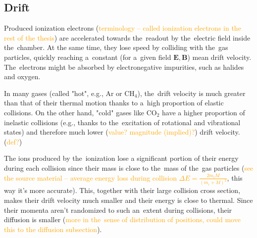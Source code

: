 		\subsection{Drift}
			Produced ionization electrons (\textcolor{orange}{terminology -- called ionization electrons in the rest of the thesis}) are accelerated towards the~readout by the~electric field inside the~chamber. At the same time, they lose speed by colliding with the~gas particles, quickly reaching a~constant (for a~given field $\mathbf{E}, \mathbf{B}$) mean drift velocity. The~electrons might be absorbed by electronegative impurities, such as halides and oxygen.
			
			In many gases (called "hot", e.g., Ar or CH$_4$), the~drift velocity is much greater than that of their thermal motion thanks to a~high proportion of elastic collisions. On the other hand, "cold" gases like CO$_2$ have a higher proportion of inelastic collisions (e.g., thanks to the~excitation of rotational and vibrational states) and therefore much lower (\textcolor{orange}{value? magnitude (implied)?}) drift velocity. (\textcolor{orange}{def?})
			
			The ions produced by the~ionization lose a significant portion of their energy during each collision since their mass is close to the~mass of the~gas particles (\textcolor{orange}{see the source material -- average energy loss during collision $\Delta E = \frac{2m_i M}{(m_i+M)^2}$}, this way it's more accurate). This, together with their large collision cross section, makes their drift velocity much smaller and their energy is close to thermal. Since their momenta aren't randomized to such an~extent during collisions, their diffusion is smaller (\textcolor{orange}{more in the~sense of distribution of positions, could move this to the diffusion subsection}).
			
